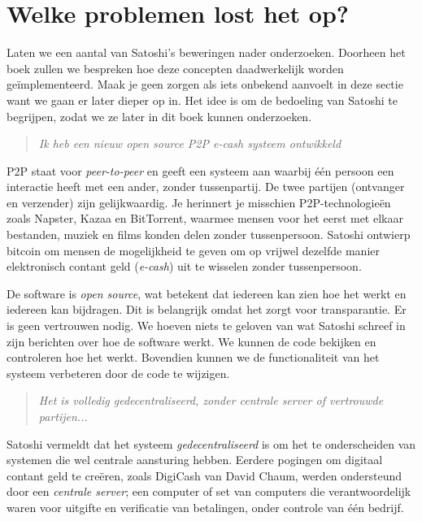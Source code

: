 \documentclass[smalldemyvopaper,11pt,twoside,onecolumn,openright,extrafontsizes]{memoir}
\begin{document}
\section{Welke problemen lost het op?}

Laten we een aantal van Satoshi's beweringen nader onderzoeken. Doorheen het boek zullen we bespreken hoe deze concepten daadwerkelijk worden geïmplementeerd. Maak je geen zorgen als iets onbekend aanvoelt in deze sectie want we gaan er later dieper op in. Het idee is om de bedoeling van Satoshi te begrijpen, zodat we ze later in dit boek kunnen onderzoeken.

\begin{quote}
\textit{Ik heb een nieuw open source P2P e-cash systeem ontwikkeld}
\end{quote}

P2P staat voor \textit{peer-to-peer} en geeft een systeem aan waarbij één persoon een interactie heeft met een ander, zonder tussenpartij. De twee partijen (ontvanger en verzender) zijn gelijkwaardig. Je herinnert je misschien P2P-technologieën zoals Napster, Kazaa en BitTorrent, waarmee mensen voor het eerst met elkaar bestanden, muziek en films konden delen zonder tussenpersoon. Satoshi ontwierp bitcoin om mensen de mogelijkheid te geven om op vrijwel dezelfde manier elektronisch contant geld (\textit{e-cash}) uit te wisselen zonder tussenpersoon.

De software is \textit{open source}, wat betekent dat iedereen kan zien hoe het werkt en iedereen kan bijdragen. Dit is belangrijk omdat het zorgt voor transparantie. Er is geen vertrouwen nodig. We hoeven niets te geloven van wat Satoshi schreef in zijn berichten over hoe de software werkt. We kunnen de code bekijken en controleren hoe het werkt. Bovendien kunnen we de functionaliteit van het systeem verbeteren door de code te wijzigen.

\begin{quote}
\textit{Het is volledig gedecentraliseerd, zonder centrale server of vertrouwde partijen...}
\end{quote}

Satoshi vermeldt dat het systeem \textit{gedecentraliseerd} is om het te onderscheiden van systemen die wel centrale aansturing hebben. Eerdere pogingen om digitaal contant geld te creëren, zoals DigiCash van David Chaum, werden ondersteund door een \textit{centrale server}; een computer of set van computers die verantwoordelijk waren voor uitgifte en verificatie van betalingen, onder controle van één bedrijf.
\end{document}
